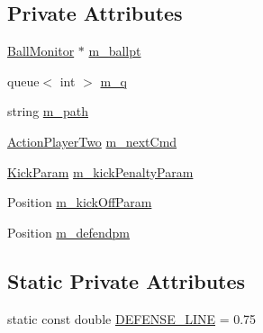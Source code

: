 \subsection*{Private Attributes}
\begin{DoxyCompactItemize}
\item 
\hyperlink{classBallMonitor}{BallMonitor} $\ast$ \hyperlink{classPlayerTwo_a14f2fe35deb15d4d45208273a51ec7eb}{m\_\-ballpt}
\item 
queue$<$ int $>$ \hyperlink{classPlayerTwo_ac2f70709bd48ad9f5c2435cbff1e65b3}{m\_\-q}
\item 
string \hyperlink{classPlayerTwo_af9880885ced53351b52dcc949f6df162}{m\_\-path}
\item 
\hyperlink{classPlayerTwo_a6dd2b1afb179fe02b677dd71ec5703d2}{ActionPlayerTwo} \hyperlink{classPlayerTwo_a35bab8a32976849cd72828a1a1fe8504}{m\_\-nextCmd}
\item 
\hyperlink{structPlayerTwo_1_1KickParam}{KickParam} \hyperlink{classPlayerTwo_ac0b6376133a18b87e4fa14036a32f0ff}{m\_\-kickPenaltyParam}
\item 
Position \hyperlink{classPlayerTwo_af294f3bef80e0df881b4452c1272376a}{m\_\-kickOffParam}
\item 
Position \hyperlink{classPlayerTwo_aa6b42d687884c55d1dd30034e7952605}{m\_\-defendpm}
\end{DoxyCompactItemize}
\subsection*{Static Private Attributes}
\begin{DoxyCompactItemize}
\item 
static const double \hyperlink{classPlayerTwo_a86e1752bf84fab5d093f93633d3e51da}{DEFENSE\_\-LINE} = 0.75
\end{DoxyCompactItemize}


